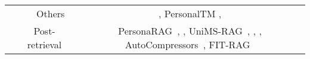 \begin{table*}[t]
{\begin{tabular}{c|c|c|c}
                                   &                                                                                                 & Others                                                                                & \citet{salemi2024optimization}, PersonalTM \cite{lian2023personaltm}, \citet{zhang2024personalized}                                                                                                                                                                                                                                                                                                                                                                                                                                                                                                                                                                                                                                                                                            \\ 
\cmidrule{2-4}
                                   & \multicolumn{2}{c|}{Post-retrieval}                                                                                                                                                      & PersonaRAG~\cite{zerhoudi2024personarag}, \citet{pavliukevich2024improving}, UniMS-RAG~\cite{wang2024unims}, \citet{salemi2024learning}, \citet{zhang2025rehearse}, AutoCompressors~\cite{chevalier2023adapting}, FIT-RAG~\cite{mao2024fit}                                                                                                                                                                                                                                                                                                                                                                                                                                                                                                                                                                                                                                                                                                                                                                \\ 
\midrule

\end{tabular}}
\end{table*}

